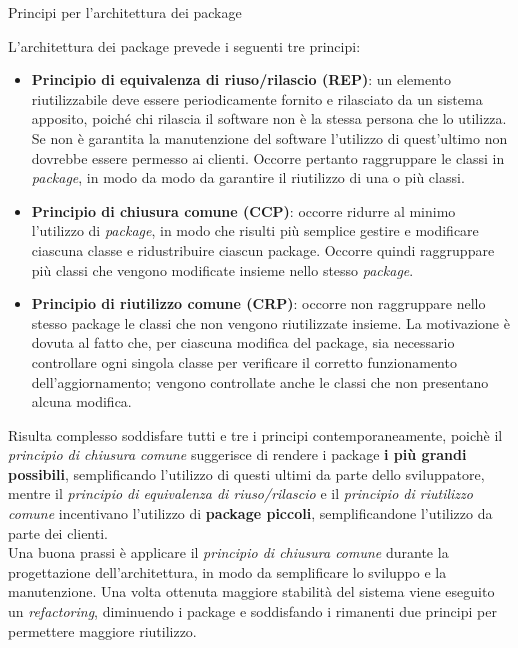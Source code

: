 \begin{problem}{1.16}
Principi per l'architettura dei package
\end{problem}
\begin{solution}
L'architettura dei package prevede i seguenti tre principi:
\begin{itemize}
	\item \textbf{Principio di equivalenza di riuso/rilascio (REP)}: un elemento riutilizzabile deve essere periodicamente fornito e rilasciato da un sistema apposito, poiché chi rilascia il software non è la stessa persona che lo utilizza.
	\newline
	Se non è garantita la manutenzione del software l'utilizzo di quest'ultimo non dovrebbe essere permesso ai clienti. Occorre pertanto raggruppare le classi in \textit{package}, in modo da modo da garantire il riutilizzo di una o più classi.
	\item \textbf{Principio di chiusura comune (CCP)}: occorre ridurre al minimo l'utilizzo di \textit{package}, in modo che risulti più semplice gestire e modificare ciascuna classe e ridustribuire ciascun package.
	\newline
	Occorre quindi raggruppare più classi che vengono modificate insieme nello stesso \textit{package}.
	\item \textbf{Principio di riutilizzo comune (CRP)}: occorre non raggruppare nello stesso package le classi che non vengono riutilizzate insieme.
	\newline La motivazione è dovuta al fatto che, per ciascuna modifica del package, sia necessario controllare ogni singola classe per verificare il corretto funzionamento dell'aggiornamento; vengono controllate anche le classi che non presentano alcuna modifica.
\end{itemize}
Risulta complesso soddisfare tutti e tre i principi contemporaneamente, poichè il \textit{principio di chiusura comune} suggerisce di rendere i package \textbf{i più grandi possibili}, semplificando l'utilizzo di questi ultimi da parte dello sviluppatore, mentre il \textit{principio di equivalenza di riuso/rilascio} e il \textit{principio di riutilizzo comune} incentivano l'utilizzo di \textbf{package piccoli}, semplificandone l'utilizzo da parte dei clienti.
\\
Una buona prassi è applicare il \textit{principio di chiusura comune} durante la progettazione dell'architettura, in modo da semplificare lo sviluppo e la manutenzione. Una volta ottenuta maggiore stabilità del sistema viene eseguito un \textit{refactoring}, diminuendo i package e soddisfando i rimanenti due principi per permettere maggiore riutilizzo.

\end{solution}
